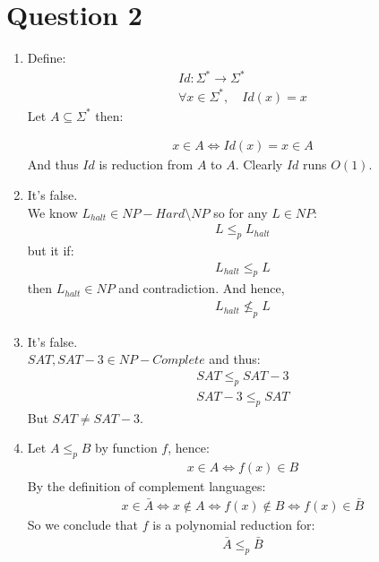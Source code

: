 \documentclass[11pt]{article}
\theoremstyle{plain}
\theoremstyle{nonumberplainnobrackets}
\begin{document}
\section*{Question 2}
\begin{enumerate}
	\item 
	Define:
	\begin{align*}
		Id: \Sigma^* \rightarrow \Sigma^*\\
		\forall x\in \Sigma^*,\quad Id(x) = x
	\end{align*}
	Let $A\subseteq \Sigma^*$ then:
	
	\begin{align*}
	x\in A \iff 
	 Id(x) = x \in A
	\end{align*}
	And thus $Id$ is reduction from $A$ to $A$. Clearly $Id$ runs $O(1)$.
	\item 
It's false.\\
	We know $L_{halt} \in NP-Hard\setminus NP$ so for any $L\in NP$:
		\begin{align*}
	L \le_p L_{halt}
	\end{align*}
	but it if:
		\begin{align*}
	L_{halt} \le_p L
	\end{align*}
	then $L_{halt} \in NP$ and contradiction. And hence,
	\begin{align*}
	L_{halt} \nleq_p L
	\end{align*}
	\item 
	It's false.\\
	$SAT,SAT-3\in NP-Complete$ and thus:
	\begin{align*}
		SAT \le_p SAT-3\\
				SAT-3 \le_p SAT
	\end{align*}
	But $SAT \ne SAT-3$.
	\item Let $A \le_p B$ by function $f$, hence:
	\begin{align*}
	x\in A \iff f(x)\in B
	\end{align*}
	By the definition of complement languages:
	\begin{align*}
	x\in \bar{A} \iff x\notin A \iff f(x)\notin B \iff f(x)\in  \bar{B}
	\end{align*}
	So we conclude that $f$ is a polynomial reduction for:
	\begin{align*}
	\bar{A} \le_p \bar{B}
	\end{align*}
\end{enumerate}
\end{document}
